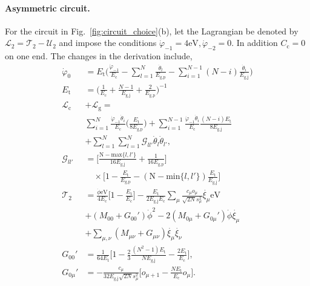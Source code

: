 \documentclass[%
reprint,
superscriptaddress,
 amsmath,amssymb,
 aps,
 prx,
longbibliography,
floatfix,
]{revtex4-2}
\begin{document}
\paragraph{Asymmetric circuit.} For the circuit in Fig.~\ref{fig:circuit_choice}(b), let the Lagrangian be denoted by $\mathcal{L}_2=\mathcal{T}_2-\mathcal{U}_2$ and impose the conditions 
$\dot{\varphi}_{-1}=4\textrm{eV},\dot{\varphi}_{-2}=0$. In addition $C_\textrm{c}=0$ on one end. The changes in the derivation include,
\begin{align}
\dot{\varphi}_0&=E_{\textrm{t}}\Big(\frac{\dot{\varphi}_{-1}}{E_{\textrm{c}}}-\sum_{l=1}^{N}\frac{\dot{\theta}_l}{E_{\textrm{g,p}}}-\sum_{i=1}^{N-1}(N-i)\frac{\dot{\theta}_i}{E_{\textrm{g,j}}}\Big)\\
E_\textrm{t}&=\Big(\frac{1}{E_{\textrm{c}}}+\frac{N-1}{E_{\textrm{g,j}}}+\frac{2}{E_{\textrm{g,p}}}\Big)^{-1}\\
\mathcal{L}_\textrm{c}&+\mathcal{L}_\textrm{g}
=\nonumber\\&\sum_{i=1}^N\frac{\dot{\varphi}_{-1}\dot{\theta}_i}{E_\textrm{c}}\Big(\frac{E_\textrm{t}}{8E_\textrm{g,p}}\Big)+\sum_{i=1}^{N-1}\frac{\dot{\varphi}_{-1}\dot{\theta}_i}{E_\textrm{c}}\frac{(N-i)E_\textrm{t}}{8E_\textrm{g,j}}\nonumber\\
&+\sum_{l=1}^{N}\sum_{l=1}^{N}\mathcal{G}_{ll'}\dot{\theta}_l\dot{\theta}_{l'},\\
\mathcal{G}_{ll'}&=\Big[\frac{\textrm{N}-\text{max}\{l,l'\}}{16E_\textrm{g,j}}+\frac{1}{16E_\textrm{g,p}}\Big]\nonumber\\&\quad\times\Big[1-\frac{E_\textrm{t}}{E_\textrm{g,p}}-(\textrm{N}-\text{min}\{l,l'\})\frac{E_\textrm{t}}{E_\textrm{g,j}}\Big]\\
\mathcal{T}_2&=\frac{\dot{\phi}\textrm{eV}}{4E_\textrm{c}}\Big[1-\frac{E_\textrm{t}}{E_\textrm{c}}\Big]-\frac{E_{\textrm{t}}}{2E_{\textrm{g,j}}E_{\textrm{c}}} \sum_\mu\frac{c_\mu o_\mu}{\sqrt{2N}s_\mu^2} \dot{\xi_\mu}\textrm{eV}\nonumber\\&+(M_{00}+G_{00}')\dot{\phi}^2-2(M_{0\mu}+G_{0\mu}')\dot{\phi}\dot{\xi_\mu}\nonumber\\&+\sum_{\mu,\nu}(M_{\mu\nu}+G_{\mu\nu})\dot{\xi_\mu}\dot{\xi_\nu}\\
G_{00}'&=\frac{1}{64E_{\textrm{t}}}\Bigg[1-\frac{2}{3}\frac{(N^2-1)E_\textrm{t}}{NE_\textrm{g,j}}-\frac{2E_\textrm{t}}{E_\textrm{c}}\Bigg],\\
G_{0\mu}'&=-\frac{c_\mu}{32E_{\textrm{g,j}}\sqrt{2N}s_\mu^2}\Bigg[o_{\mu+1}-\frac{NE_\textrm{t}}{E_\textrm{c}}o_{\mu}\Bigg].
\end{align}
\end{document}
